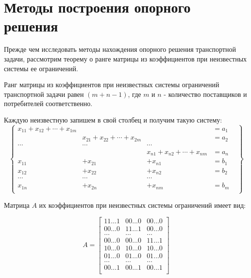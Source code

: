 \documentclass[a4paper,12pt]{article}
\begin{document}
\section{Методы построения опорного решения}
	Прежде чем исследовать методы нахождения опорного решения транспортной задачи, рассмотрим теорему о ранге матрицы из коэффициентов при неизвестных системы ее ограничений.
	
	\begin{theorem}
		Ранг матрицы из коэффициентов при неизвестных системы ограничений транспортной задачи равен $(m + n - 1)$, где $m$ и $n$ - количество поставщиков и потребителей соответственно.
	\end{theorem}
	
	Каждую неизвестную запишем в свой столбец и получим такую систему:
	\begin{equation}
		\begin{Bmatrix}
			x_{11} + x_{12} + \cdots + x_{1m} & & & = a_1\\
			& x_{21} + x_{22} + \cdots + x_{2m} & & = a_2\\
			\cdots & \cdots & \cdots & & \\
			& & x_{n1} + x_{n2} + \cdots + x_{nm} & = a_n\\
			\hline
			x_{11} & + x_{21} & + x_{n1} & = b_1 \\
			x_{12} & + x_{22} & + x_{n2} & = b_2 \\
			\cdots & \cdots & \cdots & & \\
			x_{1n} & + x_{2n} & + x_{nm} & = b_m \\
		\end{Bmatrix}
	\end{equation}

	Матрица $A$ их коэффициентов при неизвестных системы ограничений имеет вид:
	
	\begin{equation}
		A = 
		\begin{bmatrix}
			11 \ldots 1 & 00 \ldots 0 & 00 \ldots 0 \\
			00 \ldots 0 & 11 \ldots 1 & 00 \ldots 0 \\
			\ldots & \ldots & \ldots \\
			00 \ldots 0 & 00 \ldots 0 & 11 \ldots 1 \\
			10 \ldots 0 & 10 \ldots 0 & 10 \ldots 0 \\
			01 \ldots 0 & 01 \ldots 0 & 01 \ldots 0 \\
			\ldots & \ldots & \ldots \\
			00 \ldots 1 & 00 \ldots 1 & 00 \ldots 1 \\
		\end{bmatrix}
	\end{equation}
	
\end{document}
